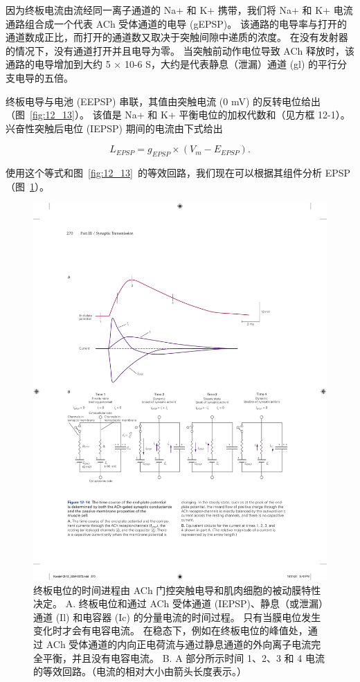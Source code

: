 因为终板电流由流经同一离子通道的 Na+ 和 K+ 携带，我们将 Na+ 和 K+ 电流通路组合成一个代表 ACh 受体通道的电导 (gEPSP)。
该通路的电导率与打开的通道数成正比，而打开的通道数又取决于突触间隙中递质的浓度。
在没有发射器的情况下，没有通道打开并且电导为零。
当突触前动作电位导致 ACh 释放时，该通路的电导增加到大约 5 × 10-6 S，大约是代表静息（泄漏）通道 (gl) 的平行分支电导的五倍。


终板电导与电池 (EEPSP) 串联，其值由突触电流 (0 mV) 的反转电位给出（图~\ref{fig:12_13}）。
该值是 Na+ 和 K+ 平衡电位的加权代数和（见方框 12-1）。
兴奋性突触后电位 (IEPSP) 期间的电流由下式给出


\begin{equation}\label{excitatory_potential}
	L_{EPSP} = g_{EPSP} \times (V_m - E_{EPSP}).
\end{equation}


使用这个等式和图~\ref{fig:12_13}~的等效回路，我们现在可以根据其组件分析 EPSP（图~\ref{fig:12_14}）。


\begin{figure}[htbp]
	\centering
	\includegraphics[width=0.95\linewidth]{chap12/fig_12_14}
	\caption{终板电位的时间进程由 ACh 门控突触电导和肌肉细胞的被动膜特性决定。 A. 终板电位和通过 ACh 受体通道 (IEPSP)、静息（或泄漏）通道 (Il) 和电容器 (Ic) 的分量电流的时间过程。 只有当膜电位发生变化时才会有电容电流。 在稳态下，例如在终板电位的峰值处，通过 ACh 受体通道的内向正电荷流与通过静息通道的外向离子电流完全平衡，并且没有电容电流。 B. A 部分所示时间 1、2、3 和 4 电流的等效回路。（电流的相对大小由箭头长度表示。）}
	\label{fig:12_14}
\end{figure}


